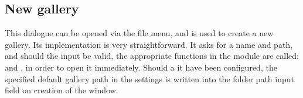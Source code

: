 \subsection{New gallery}
\def\kapitelautor{Erik Ritschl}

This dialogue can be opened via the file menu, and is used to create a new gallery. Its implementation is very straightforward. It asks for a name and path, and should the input be valid, the appropriate functions in the  module are called:  and , in order to open it immediately. Should a it have been configured, the specified default gallery path in the settings is written into the folder path input field on creation of the window.